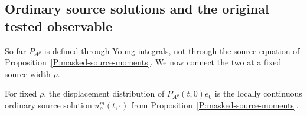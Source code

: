 \subsection{Ordinary source solutions and the original tested observable}

So far $P_{A^\rho}$ is defined through Young integrals, not through the source
equation of Proposition~\ref{P:masked-source-moments}. We now connect the two
at a fixed source width $\rho$.

\begin{lemma}
  \label{L:constant-source-solution}
  For fixed $\rho$, the displacement distribution of $P_{A^\rho}(t,0)e_0$ is the
  locally continuous ordinary source solution $u_\rho^m(t,\cdot)$ from
  Proposition~\ref{P:masked-source-moments}.
\end{lemma}

